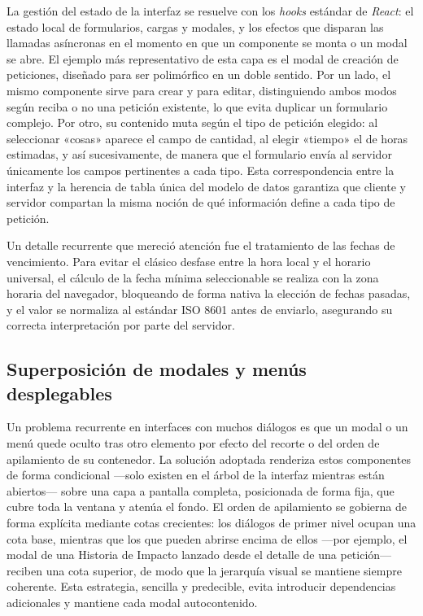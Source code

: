 \documentclass[11pt,oneside,spanish,listoffigures,listoftables]{tfgetsinf}
\begin{document}
La gestión del estado de la interfaz se resuelve con los \textit{hooks} estándar de \textit{React}: el estado local de formularios, cargas y modales, y los efectos que disparan las llamadas asíncronas en el momento en que un componente se monta o un modal se abre. El ejemplo más representativo de esta capa es el modal de creación de peticiones, diseñado para ser polimórfico en un doble sentido. Por un lado, el mismo componente sirve para crear y para editar, distinguiendo ambos modos según reciba o no una petición existente, lo que evita duplicar un formulario complejo. Por otro, su contenido muta según el tipo de petición elegido: al seleccionar «cosas» aparece el campo de cantidad, al elegir «tiempo» el de horas estimadas, y así sucesivamente, de manera que el formulario envía al servidor únicamente los campos pertinentes a cada tipo. Esta correspondencia entre la interfaz y la herencia de tabla única del modelo de datos garantiza que cliente y servidor compartan la misma noción de qué información define a cada tipo de petición.

Un detalle recurrente que mereció atención fue el tratamiento de las fechas de vencimiento. Para evitar el clásico desfase entre la hora local y el horario universal, el cálculo de la fecha mínima seleccionable se realiza con la zona horaria del navegador, bloqueando de forma nativa la elección de fechas pasadas, y el valor se normaliza al estándar ISO 8601 antes de enviarlo, asegurando su correcta interpretación por parte del servidor.

\subsection{Superposición de modales y menús desplegables}

Un problema recurrente en interfaces con muchos diálogos es que un modal o un menú quede oculto tras otro elemento por efecto del recorte o del orden de apilamiento de su contenedor. La solución adoptada renderiza estos componentes de forma condicional —solo existen en el árbol de la interfaz mientras están abiertos— sobre una capa a pantalla completa, posicionada de forma fija, que cubre toda la ventana y atenúa el fondo. El orden de apilamiento se gobierna de forma explícita mediante cotas crecientes: los diálogos de primer nivel ocupan una cota base, mientras que los que pueden abrirse encima de ellos —por ejemplo, el modal de una Historia de Impacto lanzado desde el detalle de una petición— reciben una cota superior, de modo que la jerarquía visual se mantiene siempre coherente. Esta estrategia, sencilla y predecible, evita introducir dependencias adicionales y mantiene cada modal autocontenido.
\end{document}
